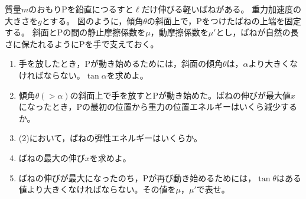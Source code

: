 \item
    \begin{mawarikomi}{150pt}{}
    質量$m$のおもりPを鉛直につるすと$\ell $だけ伸びる軽いばねがある。
    重力加速度の大きさを$g$とする。
    図のように，傾角$\theta $の斜面上で，Pをつけたばねの上端を固定する。
    斜面とPの間の静止摩擦係数を$\mu $，動摩擦係数を$\mu '$とし，ばねが自然の長さに保たれるようにPを手で支えておく。
        \begin{enumerate}
            \item 手を放したとき，Pが動き始めるためには，斜面の傾角$\theta $は，$\alpha $より大きくなければならない。$\tan{\alpha }$を求めよ。
            \item 傾角$\theta (>\alpha )$の斜面上で手を放すとPが動き始めた。ばねの伸びが最大値$x$になったとき，Pの最初の位置から重力の位置エネルギーはいくら減少するか。
            \item (2)において，ばねの弾性エネルギーはいくらか。
            \item ばねの最大の伸び$x$を求めよ。
            \item ばねの伸びが最大になったのち，Pが再び動き始めるためには，$\tan{\theta }$はある値より大きくなければならない。その値を$\mu $，$\mu '$で表せ。
        \end{enumerate}
    \end{mawarikomi}